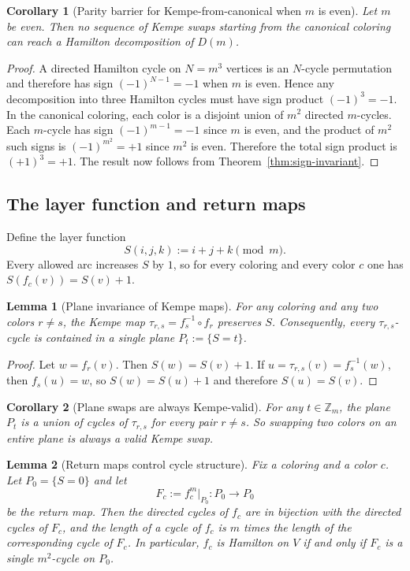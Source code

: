 \documentclass[11pt]{article}
\newtheorem{lemma}{Lemma}
\newtheorem{corollary}{Corollary}
\begin{document}
\begin{corollary}[Parity barrier for Kempe-from-canonical when $m$ is even]\label{cor:parity-barrier}
Let $m$ be even. Then no sequence of Kempe swaps starting from the canonical coloring can reach a Hamilton decomposition of $D(m)$.
\end{corollary}

\begin{proof}
A directed Hamilton cycle on $N=m^3$ vertices is an $N$-cycle permutation and therefore has sign $(-1)^{N-1}=-1$ when $m$ is even.
Hence any decomposition into three Hamilton cycles must have sign product $(-1)^3=-1$.
In the canonical coloring, each color is a disjoint union of $m^2$ directed $m$-cycles.
Each $m$-cycle has sign $(-1)^{m-1}=-1$ since $m$ is even, and the product of $m^2$ such signs is $(-1)^{m^2}=+1$ since $m^2$ is even.
Therefore the total sign product is $(+1)^3=+1$.
The result now follows from Theorem~\ref{thm:sign-invariant}.
\end{proof}

\subsection{The layer function and return maps}
Define the layer function
\[
S(i,j,k):=i+j+k\pmod m.
\]
Every allowed arc increases $S$ by $1$, so for every coloring and every color $c$ one has $S(f_c(v))=S(v)+1$.

\begin{lemma}[Plane invariance of Kempe maps]\label{lem:plane-invariant}
For any coloring and any two colors $r\ne s$, the Kempe map $\tau_{r,s}=f_s^{-1}\circ f_r$ preserves $S$.
Consequently, every $\tau_{r,s}$-cycle is contained in a single plane $P_t:=\{S=t\}$.
\end{lemma}

\begin{proof}
Let $w=f_r(v)$. Then $S(w)=S(v)+1$.
If $u=\tau_{r,s}(v)=f_s^{-1}(w)$, then $f_s(u)=w$, so $S(w)=S(u)+1$ and therefore $S(u)=S(v)$.
\end{proof}

\begin{corollary}[Plane swaps are always Kempe-valid]\label{cor:plane-swaps}
For any $t\in\mathbb Z_m$, the plane $P_t$ is a union of cycles of $\tau_{r,s}$ for every pair $r\ne s$.
So swapping two colors on an entire plane is always a valid Kempe swap.
\end{corollary}

\begin{lemma}[Return maps control cycle structure]\label{lem:return}
Fix a coloring and a color $c$.
Let $P_0=\{S=0\}$ and let
\[
F_c:=f_c^m\big|_{P_0}:P_0\to P_0
\]
be the return map.
Then the directed cycles of $f_c$ are in bijection with the directed cycles of $F_c$, and the length of a cycle of $f_c$ is $m$ times the length of the corresponding cycle of $F_c$.
In particular, $f_c$ is Hamilton on $V$ if and only if $F_c$ is a single $m^2$-cycle on $P_0$.
\end{lemma}
\end{document}
